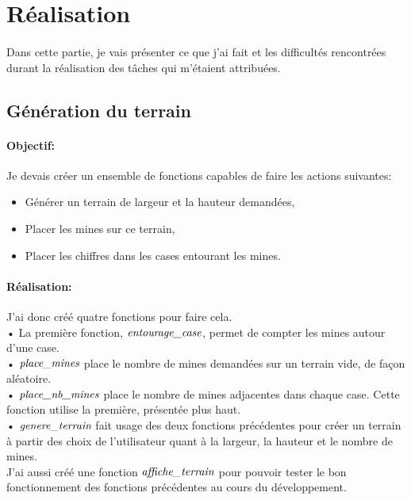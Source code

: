 \documentclass[12pt, a4paper]{article}
\begin{document}
\section{Réalisation}

\paragraph{}
Dans cette partie, je vais présenter ce que j'ai fait et les difficultés
rencontrées durant la réalisation des tâches qui m'étaient attribuées.

\subsection{Génération du terrain}

\paragraph{Objectif:}
Je devais créer un ensemble de fonctions capables de faire les actions
suivantes:

\begin{itemize}
\item Générer un terrain de largeur et la hauteur demandées,
\item Placer les mines sur ce terrain,
\item Placer les chiffres dans les cases entourant les mines.
\end{itemize}

\paragraph{Réalisation:}
J'ai donc créé quatre fonctions pour faire cela. \\
• La première fonction, $\emph{entourage\_case}$, permet de compter les mines
autour d'une case. \\
• $\emph{place\_mines}$ place le nombre de mines demandées sur un terrain vide,
de façon aléatoire. \\
• $\emph{place\_nb\_mines}$ place le nombre de mines adjacentes dans chaque
case. Cette fonction utilise la première, présentée plus haut. \\
• $\emph{genere\_terrain}$ fait usage des deux fonctions précédentes pour
créer un terrain à partir des choix de l'utilisateur quant à la largeur, la
hauteur et le nombre de mines. \\
J'ai aussi créé une fonction $\emph{affiche\_terrain}$ pour pouvoir tester le
bon fonctionnement des fonctions précédentes au cours du développement.
\end{document}
